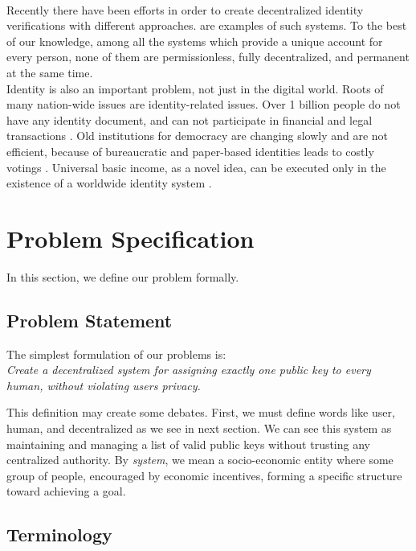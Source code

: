 \documentclass[conference]{IEEEtran}
\begin{document}
\\
Recently there have been efforts in order to create decentralized identity verifications with different approaches. \cite{proofofpersonhood, uport, sovrin} are examples of such systems. To the best of our knowledge, among all the systems which provide a unique account for every person, none of them are permissionless, fully decentralized, and permanent at the same time.
\\
Identity is also an important problem, not just in the digital world. Roots of many nation-wide issues are identity-related issues. Over 1 billion people do not have any identity document, and can not participate in financial and legal transactions \cite{worldbankid}. Old institutions for democracy are changing slowly and are not efficient, because of bureaucratic and paper-based identities leads to costly votings \cite{democracyearth}. Universal basic income, as a novel idea, can be executed only in the existence of a worldwide identity system \cite{basicincome}.




\section{ Problem Specification}
In this section, we define our problem formally.

\subsection{Problem Statement}
The simplest formulation of our problems is: \\
\textit{Create a decentralized system for assigning exactly one public key to every human, without violating users privacy. }


This definition may create some debates. First, we must define words like user, human, and decentralized as we see in next section. We can see this system as maintaining and managing a list of valid public keys without trusting any centralized authority. By \textit{system}, we mean a socio-economic entity where some group of people, encouraged by economic incentives, forming a specific structure toward achieving a goal. 

\subsection{Terminology}
\end{document}
